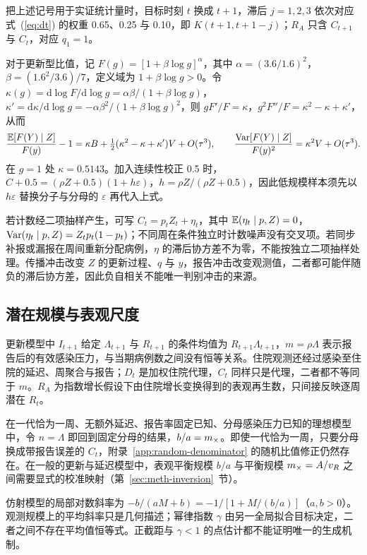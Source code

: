 把上述记号用于实证统计量时，目标时刻 $t$ 换成 $t+1$，滞后 $j=1,2,3$ 依次对应式~(\ref{eq:dt}) 的权重 0.65、0.25 与 0.10，即 $K(t+1,t+1-j)$；$R_A$ 只含 $C_{t+1}$ 与 $C_t$，对应 $q_1=1$。

对于更新型比值，记 $F(g)=[1+\beta\log g]^{\alpha}$，其中 $\alpha=(3.6/1.6)^2$，$\beta=(1.6^2/3.6)/7$，定义域为 $1+\beta\log g>0$。令 $\kappa(g)=\mathrm{d}\log F/\mathrm{d}\log g=\alpha\beta/(1+\beta\log g)$，$\kappa'=\mathrm{d}\kappa/\mathrm{d}\log g=-\alpha\beta^2/(1+\beta\log g)^2$，则 $gF'/F=\kappa$，$g^2F''/F=\kappa^2-\kappa+\kappa'$，从而
\begin{equation}
  \frac{\mathbb{E}[F(Y)\mid Z]}{F(y)}-1=\kappa B+\tfrac12(\kappa^2-\kappa+\kappa')V+O(\tau^3),\qquad
  \frac{\mathrm{Var}[F(Y)\mid Z]}{F(y)^2}=\kappa^2V+O(\tau^3).
\end{equation}
在 $g=1$ 处 $\kappa=0.5143$。加入连续性校正 0.5 时，$C+0.5=(\rho Z+0.5)(1+h\varepsilon)$，$h=\rho Z/(\rho Z+0.5)$，因此低规模样本须先以 $h\varepsilon$ 替换分子与分母的 $\varepsilon$ 再代入上式。

若计数经二项抽样产生，可写 $C_t=p_tZ_t+\eta_t$，其中 $\mathbb{E}(\eta_t\mid p,Z)=0$，$\mathrm{Var}(\eta_t\mid p,Z)=Z_tp_t(1-p_t)$；不同周在条件独立时计数噪声没有交叉项。若同步补报或漏报在周间重新分配病例，$\eta$ 的滞后协方差不为零，不能按独立二项抽样处理。传播冲击改变 $Z$ 的更新过程、$q$ 与 $y$，报告冲击改变观测值，二者都可能伴随负的滞后协方差，因此负自相关不能唯一判别冲击的来源。

\subsection{潜在规模与表观尺度}
\label{app:latent-scale}

更新模型中 $I_{t+1}$ 给定 $\Lambda_{t+1}$ 与 $R_{t+1}$ 的条件均值为 $R_{t+1}\Lambda_{t+1}$，$m=\rho\Lambda$ 表示报告后的有效感染压力，与当期病例数之间没有恒等关系。住院观测还经过感染至住院的延迟、周聚合与报告；$D_t$ 是加权住院代理，$C_t$ 同样只是代理，二者都不等同于 $m$。$R_A$ 为指数增长假设下由住院增长变换得到的表观再生数，只间接反映逐周潜在 $R_t$。

在一代恰为一周、无额外延迟、报告率固定已知、分母感染压力已知的理想模型中，令 $n=\Lambda$ 即回到固定分母的结果，$b/a=m_{\times}$。即使一代恰为一周，只要分母换成带报告误差的 $C_t$，附录~\ref{app:random-denominator} 的随机比值修正仍然存在。在一般的更新与延迟模型中，表观平衡规模 $b/a$ 与平衡规模 $m_{\times}=A/v_R$ 之间需要显式的校准映射（第~\ref{sec:meth-inversion}~节）。

仿射模型的局部对数斜率为 $-b/(aM+b)=-1/[1+M/(b/a)]$（$a,b>0$）。观测规模上的平均斜率只是几何描述；幂律指数 $\gamma$ 由另一全局拟合目标决定，二者之间不存在平均值恒等式。正截距与 $\gamma<1$ 的点估计都不能证明唯一的生成机制。

